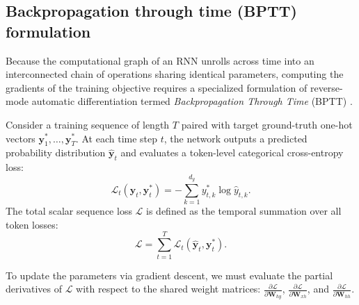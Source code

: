 \documentclass[../../main.tex]{subfiles}
\begin{document}
\subsection{Backpropagation through time (BPTT) formulation}
\label{subsec:rnn_bptt_formulation}

Because the computational graph of an RNN unrolls across time into an interconnected chain of operations sharing identical parameters, computing the gradients of the training objective requires a specialized formulation of reverse-mode automatic differentiation termed \textit{Backpropagation Through Time} (BPTT) \citep{werbos1990}.

Consider a training sequence of length $T$ paired with target ground-truth one-hot vectors $\mathbf{y}_1^*, \dots, \mathbf{y}_T^*$. At each time step $t$, the network outputs a predicted probability distribution $\hat{\mathbf{y}}_t$ and evaluates a token-level categorical cross-entropy loss:
\begin{equation}
\mathcal{L}_t\left(\hat{\mathbf{y}}_t, \mathbf{y}_t^*\right) = -\sum_{k=1}^{d_y} y_{t, k}^* \log \hat{y}_{t, k}.
\end{equation}
The total scalar sequence loss $\mathcal{L}$ is defined as the temporal summation over all token losses:
\begin{equation}
\mathcal{L} = \sum_{t=1}^T \mathcal{L}_t\left(\hat{\mathbf{y}}_t, \mathbf{y}_t^*\right).
\label{eq:rnn_total_loss}
\end{equation}

To update the parameters via gradient descent, we must evaluate the partial derivatives of $\mathcal{L}$ with respect to the shared weight matrices: $\frac{\partial \mathcal{L}}{\partial \mathbf{W}_{hy}}$, $\frac{\partial \mathcal{L}}{\partial \mathbf{W}_{xh}}$, and $\frac{\partial \mathcal{L}}{\partial \mathbf{W}_{hh}}$.
\end{document}
